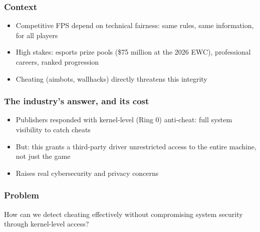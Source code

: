 \begin{frame}
	\frametitle{Context}
	\begin{itemize}
		\item Competitive FPS depend on technical fairness: same rules, same information, for all players
		\item High stakes: esports prize pools (\$75 million at the 2026 EWC), professional careers, ranked progression
		\item Cheating (aimbots, wallhacks) directly threatens this integrity
	\end{itemize}
\end{frame}

\begin{frame}
	\frametitle{The industry's answer, and its cost}
	\begin{itemize}
		\item Publishers responded with kernel-level (Ring 0) anti-cheat: full system visibility to catch cheats
		\item But: this grants a third-party driver unrestricted access to the entire machine, not just the game
		\item Raises real cybersecurity and privacy concerns
	\end{itemize}
\end{frame}

\begin{frame}
	\frametitle{Problem}
	\begin{center}
		How can we detect cheating effectively without compromising system security through kernel-level access?
	\end{center}
\end{frame}
